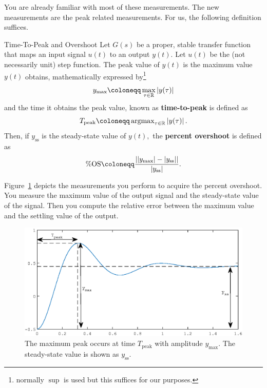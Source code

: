 You are already familiar with most of these measurements. The new measurements
are the peak related measurements. For us, the following definition suffices.
%
\begin{definition}[]{Time-To-Peak and Overshoot}
  Let \(G(s)\) be a proper, stable transfer function
  that maps an input signal \(u(t)\) to an output \(y(t).\)
%
  Let \(u(t)\) be the (not necessarily unit) step function. The peak value
  of \(y(t)\) is the maximum value \(y(t)\) obtains, mathematically expressed
  by\footnote{normally \(\sup\) is used but this suffices for our purposes.}
  \[
    y_\mathrm{max} \defineas \max_{\tau \in \Real} \left| y(\tau) \right|
  \]
  and the time it obtains the peak value, known as \textbf{time-to-peak}
  is defined as
  \[
    T_\mathrm{peak} \defineas \argmax_{\tau \in \Real} \left| y(\tau) \right|.
  \]
  Then, if \(y_\mathrm{ss}\) is the steady-state value of \(y(t),\) the
  \textbf{percent overshoot} is defined as
  \[
    \%\mathrm{OS}
      \defineas
        \frac{%
          \left|
            \left|y_\mathrm{max}\right| - \left|y_\mathrm{ss}\right|
          \right|%
        }{%
          \left| y_\mathrm{ss}\right|%
        }.
  \]
\end{definition}
%
Figure~\ref{fig:lab2:peak} depicts the measurements you perform to acquire
the percent overshoot. You measure the maximum value of the output
signal and the steady-state value of the signal. Then you
compute the relative error between the maximum value and the settling value of
the output.
%
\begin{figure}
  \includegraphics{images/Lab_2_Peak.eps}
  \caption[Depicting Overshoot Measurements for a Second-Order System.]{%
    The maximum peak occurs at time \(T_\mathrm{peak}\) with amplitude
    \(y_\mathrm{max}.\) The steady-state value is shown as \(y_{\mathrm{ss}}.\)
  }
  \label{fig:lab2:peak}
\end{figure}
%
